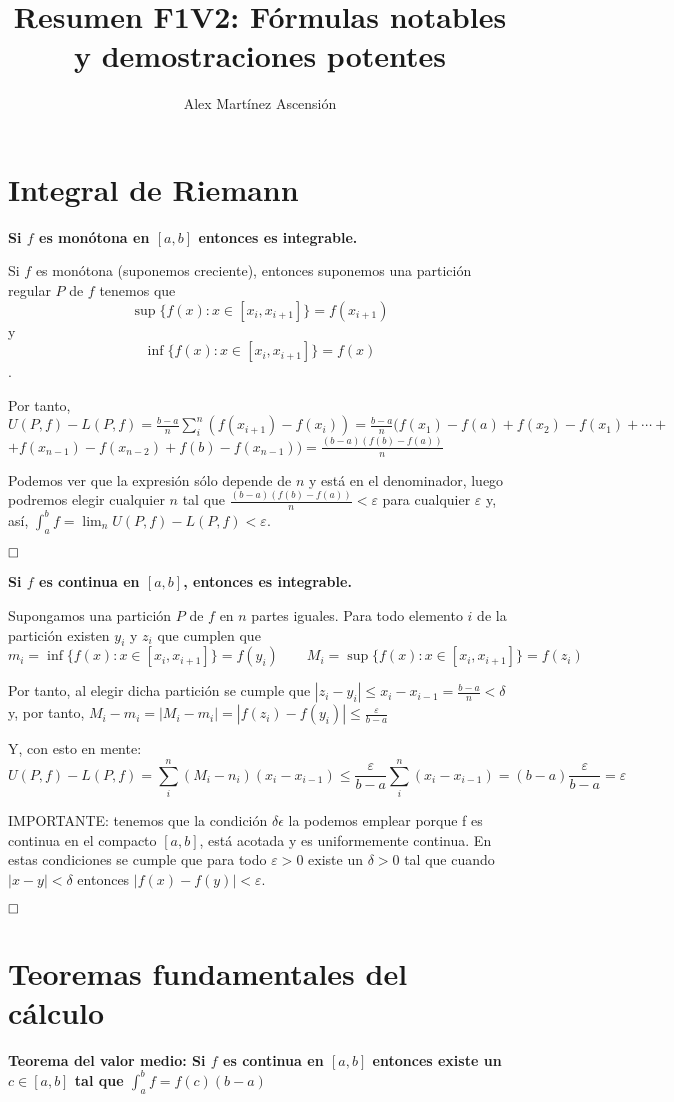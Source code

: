 \documentclass[a4paper]{article}
\title{\Huge{\vspace{-1em}Resumen F1V2: Fórmulas notables y demostraciones potentes}}
\author{\Large{\vspace{-1em}Alex Mart\'inez Ascensi\'on}}
\newcommand{\qed}{\begin{flushright}
		{$\newline\square$}
	\end{flushright}}
\begin{document}
	\maketitle
	
	\section{Integral de Riemann}
		\textbf{Si $f$ es monótona en $[a,b]$ entonces es integrable.}
	
	
	Si $f$ es monótona (suponemos creciente), entonces suponemos una partición regular $P$ de $f$ tenemos que $$\sup\{f(x):x\in[x_i, x_{i+1}] \} = f(x_{i+1})$$ y $$\inf\{f(x):x\in[x_i,x_{i+1}]\} = f(x)$$.
	
	Por tanto, $U(P,f) - L(P,f) = \frac{b-a}{n}\sum_i^n \left( f(x_{i+1})-f(x_i) \right) = \frac{b-a}{n}(f(x_1) - f(a) + f(x_2) - f(x_1) + \cdots +$\linebreak $+f(x_{n-1}) - f(x_{n-2}) + f(b) - f(x_{n-1})) = \frac{(b-a)(f(b)-f(a))}{n}$
	
	Podemos ver que la expresión sólo depende de $n$ y está en el denominador, luego podremos elegir cualquier $n$ tal que $\frac{(b-a)(f(b)-f(a))}{n} < \varepsilon$ para cualquier $\varepsilon$ y, así, $\int^b_a f = \lim_n U(P,f) - L(P,f) < \varepsilon$.	 \qed
	
	\textbf{Si $f$ es continua en $[a,b]$, entonces es integrable.}
	
	Supongamos una partición $P$ de $f$ en $n$ partes iguales. Para todo elemento $i$ de la partición existen $y_i$ y $z_i$ que cumplen que 
	$$m_i = \inf\{f(x):x\in[x_i, x_{i+1}]\} = f(y_i) \qquad 
	M_i = \sup\{f(x):x\in[x_i, x_{i+1}]\} = f(z_i)$$
	
	
	Por tanto, al elegir dicha partición se cumple que $|z_i-y_i| \le x_i-x_{i-1} = \frac{b-a}{n}<\delta$ y, por tanto, $M_i-m_i = |M_i-m_i| = |f(z_i) - f(y_i)| \le \frac{\varepsilon}{b-a} $
	
	Y, con esto en mente:
	$$U(P,f) - L(P,f) = \sum^n_i(M_i-n_i)(x_i-x_{i-1}) \le \frac{\varepsilon}{b-a}\sum^n_i(x_i-x_{i-1}) = 
	(b-a)\frac{\varepsilon}{b-a} = \varepsilon$$
	
	IMPORTANTE: tenemos que la condición $\delta\epsilon$ la podemos emplear porque f es continua en el compacto $[a,b]$, está acotada y es uniformemente continua. En estas condiciones se cumple que para todo $\varepsilon>0$ existe un $\delta> 0$ tal que cuando $|x-y|<\delta$ entonces $|f(x)-f(y)|<\varepsilon$.\qed
	

\section{Teoremas fundamentales del cálculo}
\textbf{Teorema del valor medio: Si $f$ es continua en $[a,b]$ entonces existe un $c\in[a,b]$ tal que $\int^b_a f = f(c)(b-a)$}
\end{document}
